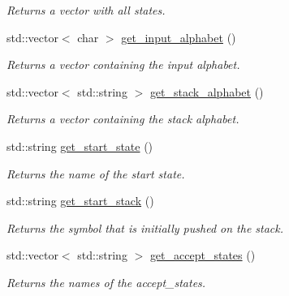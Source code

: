 \begin{DoxyCompactItemize}
\begin{DoxyCompactList}\small\item\em \-Returns a vector with all states. \end{DoxyCompactList}\item 
std\-::vector$<$ char $>$ \hyperlink{classPDA_1_1PDA_ad989320dbb133e0660c13f132a156faa}{get\-\_\-input\-\_\-alphabet} ()
\begin{DoxyCompactList}\small\item\em \-Returns a vector containing the input alphabet. \end{DoxyCompactList}\item 
std\-::vector$<$ std\-::string $>$ \hyperlink{classPDA_1_1PDA_a064c09c135d5fb119bf2fc6441f609d0}{get\-\_\-stack\-\_\-alphabet} ()
\begin{DoxyCompactList}\small\item\em \-Returns a vector containing the stack alphabet. \end{DoxyCompactList}\item 
std\-::string \hyperlink{classPDA_1_1PDA_a8910eb9fb60849761c0d3603b7f9e3ea}{get\-\_\-start\-\_\-state} ()
\begin{DoxyCompactList}\small\item\em \-Returns the name of the start state. \end{DoxyCompactList}\item 
std\-::string \hyperlink{classPDA_1_1PDA_a261cfda519426a8c77a5112cf67abf58}{get\-\_\-start\-\_\-stack} ()
\begin{DoxyCompactList}\small\item\em \-Returns the symbol that is initially pushed on the stack. \end{DoxyCompactList}\item 
std\-::vector$<$ std\-::string $>$ \hyperlink{classPDA_1_1PDA_ad9cdcbca9a4d4f83cfc763a1429ee937}{get\-\_\-accept\-\_\-states} ()
\begin{DoxyCompactList}\small\item\em \-Returns the names of the accept\-\_\-states. \end{DoxyCompactList}\end{DoxyCompactItemize}
